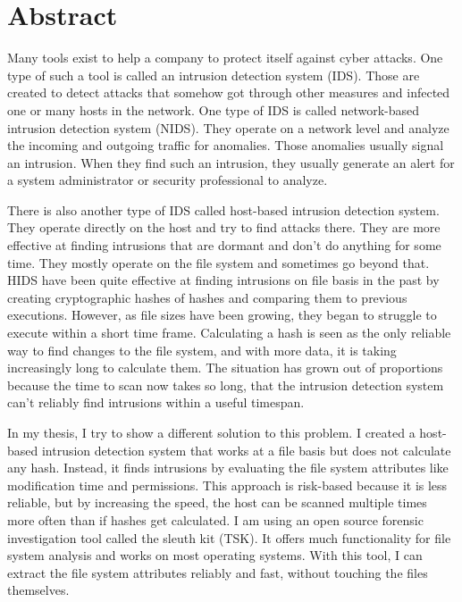 \chapter*{Abstract}
\label{chap:abstract}

Many tools exist to help a company to protect itself against cyber attacks. One type of such a tool is called an intrusion detection system (IDS). Those are created to detect attacks that somehow got through other measures and infected one or many hosts in the network. One type of IDS is called network-based intrusion detection system (NIDS). They operate on a network level and analyze the incoming and outgoing traffic for anomalies. Those anomalies usually signal an intrusion. When they find such an intrusion, they usually generate an alert for a system administrator or security professional to analyze. 

There is also another type of IDS called host-based intrusion detection system. They operate directly on the host and try to find attacks there. They are more effective at finding intrusions that are dormant and don't do anything for some time. They mostly operate on the file system and sometimes go beyond that. HIDS have been quite effective at finding intrusions on file basis in the past by creating cryptographic hashes of hashes and comparing them to previous executions. However, as file sizes have been growing, they began to struggle to execute within a short time frame. Calculating a hash is seen as the only reliable way to find changes to the file system, and with more data, it is taking increasingly long to calculate them. The situation has grown out of proportions because the time to scan now takes so long, that the intrusion detection system can't reliably find intrusions within a useful timespan.

In my thesis, I try to show a different solution to this problem. I created a host-based intrusion detection system that works at a file basis but does not calculate any hash. Instead, it finds intrusions by evaluating the file system attributes like modification time and permissions. This approach is risk-based because it is less reliable, but by increasing the speed, the host can be scanned multiple times more often than if hashes get calculated. I am using an open source forensic investigation tool called the sleuth kit (TSK). It offers much functionality for file system analysis and works on most operating systems. With this tool, I can extract the file system attributes reliably and fast, without touching the files themselves.

